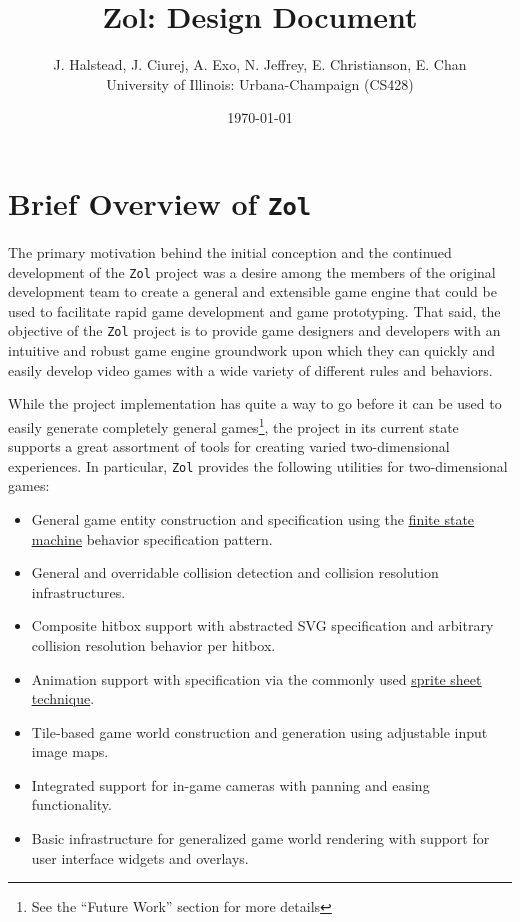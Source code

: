 \documentclass{article}
\newcommand{\projectname}[0] {\texttt{Zol} }
\newcommand{\hreffsm}[1] {\href{http://en.wikipedia.org/wiki/Finite-state\_machine}{{\color{blue}\underline{#1}}}}
\begin{document}
	\title{Zol: Design Document}
	\author{J. Halstead, J. Ciurej, A. Exo, N. Jeffrey, E. Christianson, E. Chan \\
		University of Illinois: Urbana-Champaign (CS428)}
	\date{\today}
	\maketitle

	\tableofcontents
	\clearpage

	\section[Overview]{Brief Overview of \projectname}
	The primary motivation behind the initial conception and the continued
	development of the \projectname project was a desire among the members
	of the original development team to create a general and extensible game
	engine that could be used to facilitate rapid game development and game
	prototyping.  That said, the objective of the \projectname project is
	to provide game designers and developers with an intuitive and robust game
	engine groundwork upon which they can quickly and easily develop video
	games with a wide variety of different rules and behaviors.

	While the project implementation has quite a way to go before it can be
	used to easily generate completely general games\footnote{See the
	``Future Work'' section for more details}, the project in its current state
	supports a great assortment of tools for creating varied two-dimensional
	experiences.  In particular, \projectname provides the following utilities
	for two-dimensional games:

	\begin{itemize}
		\item General game entity construction and specification using the
            \hreffsm{finite state machine} behavior specification pattern.

		\item General and overridable collision detection and collision
		resolution infrastructures.

		\item Composite hitbox support with abstracted SVG specification and
		arbitrary collision resolution behavior per hitbox.

		\item Animation support with specification via the commonly used
		\href{http://en.wikipedia.org/wiki/Sprite\_(computer\_graphics)#Sprites\_by\_CSS}
        {{\color{blue}\underline{sprite sheet technique}}}.

		\item Tile-based game world construction and generation using adjustable
		input image maps.

		\item Integrated support for in-game cameras with panning and easing
		functionality.

		\item Basic infrastructure for generalized game world rendering with
		support for user interface widgets and overlays.
	\end{itemize}
\end{document}
